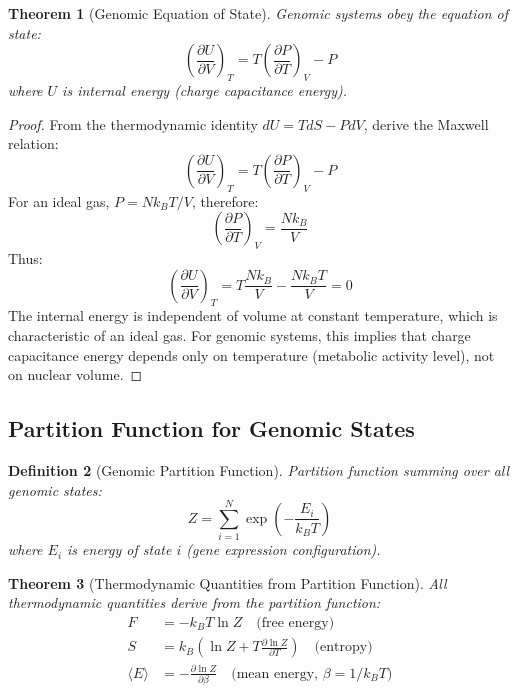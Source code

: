 \documentclass[11pt,a4paper]{article}
\newtheorem{theorem}{Theorem}[section]
\newtheorem{definition}[theorem]{Definition}
\theoremstyle{remark}
\begin{document}
\begin{theorem}[Genomic Equation of State]
\label{thm:genomic_eos}
Genomic systems obey the equation of state:
\begin{equation}
\left(\frac{\partial U}{\partial V}\right)_T = T\left(\frac{\partial P}{\partial T}\right)_V - P
\end{equation}
where $U$ is internal energy (charge capacitance energy).
\end{theorem}

\begin{proof}
From the thermodynamic identity $dU = TdS - PdV$, derive the Maxwell relation:
\begin{equation}
\left(\frac{\partial U}{\partial V}\right)_T = T\left(\frac{\partial P}{\partial T}\right)_V - P
\end{equation}
For an ideal gas, $P = Nk_BT/V$, therefore:
\begin{equation}
\left(\frac{\partial P}{\partial T}\right)_V = \frac{Nk_B}{V}
\end{equation}
Thus:
\begin{equation}
\left(\frac{\partial U}{\partial V}\right)_T = T\frac{Nk_B}{V} - \frac{Nk_BT}{V} = 0
\end{equation}
The internal energy is independent of volume at constant temperature, which is characteristic of an ideal gas. For genomic systems, this implies that charge capacitance energy depends only on temperature (metabolic activity level), not on nuclear volume.
\end{proof}

\subsection{Partition Function for Genomic States}

\begin{definition}[Genomic Partition Function]
\label{def:genomic_partition_function}
Partition function summing over all genomic states:
\begin{equation}
Z = \sum_{i=1}^N \exp\left(-\frac{E_i}{k_BT}\right)
\end{equation}
where $E_i$ is energy of state $i$ (gene expression configuration).
\end{definition}

\begin{theorem}[Thermodynamic Quantities from Partition Function]
\label{thm:thermo_from_partition}
All thermodynamic quantities derive from the partition function:
\begin{align}
F &= -k_BT\ln Z \quad \text{(free energy)} \\
S &= k_B\left(\ln Z + T\frac{\partial\ln Z}{\partial T}\right) \quad \text{(entropy)} \\
\langle E\rangle &= -\frac{\partial\ln Z}{\partial\beta} \quad \text{(mean energy, } \beta = 1/k_BT\text{)}
\end{align}
\end{theorem}
\end{document}
